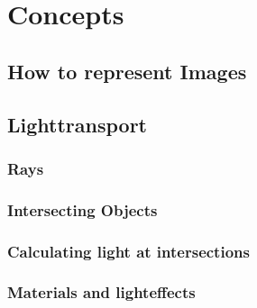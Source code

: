 \chapter{Concepts} %
\label{cha:concepts} %

\section{How to represent Images}

\section{Lighttransport}

 \subsection{Rays}
 \subsection{Intersecting Objects}
 \subsection{Calculating light at intersections}
 \subsection{Materials and lighteffects}
